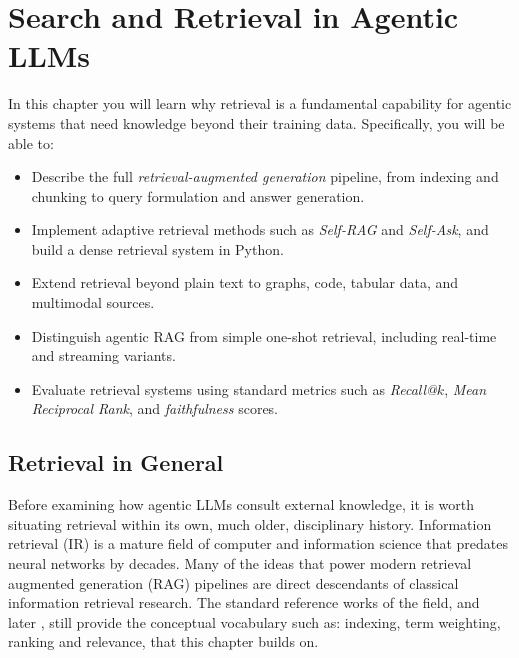 
\chapter{Search and Retrieval in Agentic LLMs}\label{sec:rag}


\begin{learningbox}
In this chapter you will learn why retrieval is a fundamental 
capability for agentic systems that need knowledge beyond their 
training data. Specifically, you will be able to:
\begin{itemize}[leftmargin=*, nosep]
    \item Describe the full {\em retrieval-augmented generation} pipeline, from indexing and chunking to query formulation and answer generation.
    \item Implement adaptive retrieval methods such as \textit{Self-RAG} and \textit{Self-Ask}, and build a dense retrieval system in Python.
    \item Extend retrieval beyond plain text to graphs, code, tabular   data, and multimodal sources.
    \item Distinguish agentic RAG from simple one-shot retrieval, including real-time and streaming variants.
    \item Evaluate retrieval systems using standard metrics such as  \textit{Recall@$k$}, \textit{Mean Reciprocal Rank}, and \textit{faithfulness} scores.
\end{itemize}
\end{learningbox}



\section{Retrieval in General}
\label{sec:retrieval-origins}

Before examining how agentic LLMs consult external knowledge, it is worth situating retrieval within its own, much older, disciplinary history. Information retrieval (IR) is a mature field of computer and information science that predates neural networks by decades. Many of the ideas that power modern retrieval augmented generation (RAG) pipelines are direct descendants of classical information retrieval research. The standard reference works of the field, \citet{salton1983introduction} and later \citet{manning2008introduction}, still provide the conceptual vocabulary such as: indexing, term weighting, ranking and relevance,  that this chapter builds on.

